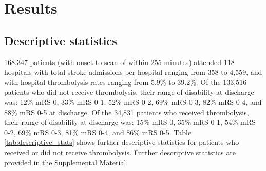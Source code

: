 \section{Results}

\subsection{Descriptive statistics}

168,347 patients (with onset-to-scan of within 255 minutes) attended 118 hospitals with total stroke admissions per hospital ranging from 358 to 4,559, and with hospital thrombolysis rates ranging from 5.9\% to 39.2\%. Of the 133,516 patients who did not receive thrombolysis, their range of disability at discharge was: 12\% mRS 0, 33\% mRS 0-1, 52\% mRS 0-2, 69\% mRS 0-3, 82\% mRS 0-4, and 88\% mRS 0-5 at discharge. Of the 34,831 patients who received thrombolysis, their range of disability at discharge was: 15\% mRS 0, 35\% mRS 0-1, 54\% mRS 0-2, 69\% mRS 0-3, 81\% mRS 0-4, and 86\% mRS 0-5. Table \ref{tab:descriptive_stats} shows further descriptive statistics for patients who received or did not receive thrombolysis. Further descriptive statistics are provided in the Supplemental Material.

